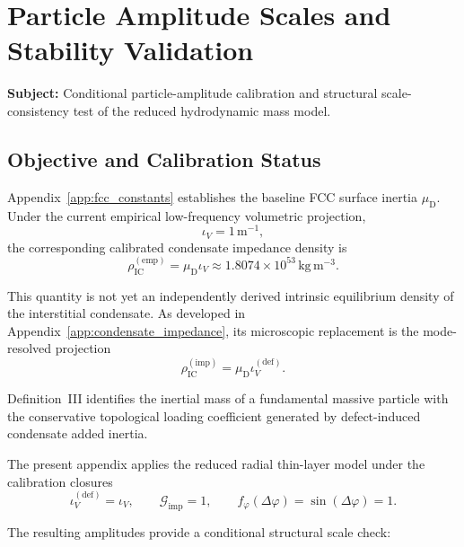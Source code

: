 \chapter{Particle Amplitude Scales and Stability Validation}
\label{app:particle_amplitude}

\noindent\textbf{Subject:} Conditional particle-amplitude calibration and structural scale-consistency test of the reduced hydrodynamic mass model.

\section{Objective and Calibration Status}

Appendix~\ref{app:fcc_constants} establishes the baseline FCC surface inertia $\mu_{\mathrm{D}}$. Under the current empirical low-frequency volumetric projection,
\begin{equation}
    \iota_V = 1\,\mathrm{m}^{-1},
\end{equation}
the corresponding calibrated condensate impedance density is
\begin{equation}
    \rho_{\mathrm{IC}}^{(\mathrm{emp})} = \mu_{\mathrm{D}}\iota_V \approx 1.8074\times10^{53}\,\mathrm{kg\,m^{-3}}.
\end{equation}

This quantity is not yet an independently derived intrinsic equilibrium density of the interstitial condensate. As developed in Appendix~\ref{app:condensate_impedance}, its microscopic replacement is the mode-resolved projection
\begin{equation}
    \rho_{\mathrm{IC}}^{(\mathrm{imp})} = \mu_{\mathrm{D}} \iota_V^{(\mathrm{def})}.
\end{equation}

Definition~III identifies the inertial mass of a fundamental massive particle with the conservative topological loading coefficient generated by defect-induced condensate added inertia.

The present appendix applies the reduced radial thin-layer model under the calibration closures
\begin{equation}
    \iota_V^{(\mathrm{def})} = \iota_V, \qquad \mathcal{G}_{\mathrm{imp}} = 1, \qquad f_{\varphi}(\Delta\varphi) = \sin(\Delta\varphi) = 1.
\end{equation}

The resulting amplitudes provide a conditional structural scale check:

